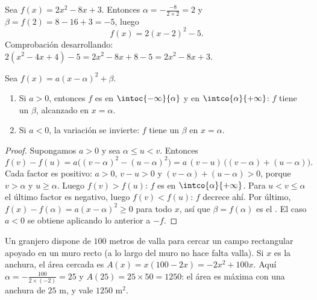 \begin{example}\label{ex:g11:quad:canonical}
Sea $f(x) = 2x^2 - 8x + 3$. Entonces $\alpha = -\frac{-8}{2 \times 2} = 2$
y $\beta = f(2) = 8 - 16 + 3 = -5$, luego
\[
f(x) = 2(x - 2)^2 - 5 .
\]
Comprobación desarrollando: $2(x^2 - 4x + 4) - 5 = 2x^2 - 8x + 8 - 5 =
2x^2 - 8x + 3$.
\end{example}

\begin{proposition}\label{prop:g11:quad:variations}
Sea $f(x) = a(x-\alpha)^2 + \beta$.
\begin{enumerate}
  \item Si $a > 0$, entonces $f$ es  en $\intoc{-\infty}{\alpha}$
        y  en $\intco{\alpha}{+\infty}$: $f$ tiene un
        \emph{} $\beta$, alcanzado en $x = \alpha$.
  \item Si $a < 0$, la variación se invierte: $f$ tiene un \emph{}
        $\beta$ en $x = \alpha$.
\end{enumerate}
\end{proposition}

\begin{proof}
Supongamos $a > 0$ y sea $\alpha \leq u < v$. Entonces
\[
f(v) - f(u) = a\bigl((v-\alpha)^2 - (u-\alpha)^2\bigr)
= a\,(v - u)\,\bigl((v-\alpha) + (u-\alpha)\bigr).
\]
Cada factor es positivo: $a > 0$, $v - u > 0$ y
$(v-\alpha) + (u-\alpha) > 0$, porque $v > \alpha$ y $u \geq \alpha$.
Luego $f(v) > f(u)$: $f$ es  en $\intco{\alpha}{+\infty}$. Para
$u < v \leq \alpha$ el último factor es negativo, luego $f(v) < f(u)$: $f$
decrece ahí. Por último, $f(x) - f(\alpha) = a(x-\alpha)^2 \geq 0$ para
todo $x$, así que $\beta = f(\alpha)$ es el . El caso $a < 0$ se
obtiene aplicando lo anterior a $-f$.
\end{proof}

\begin{example}
Un granjero dispone de $100$ metros de valla para cercar un campo
rectangular apoyado en un muro recto (a lo largo del muro no hace falta
valla). Si $x$ es la anchura, el área cercada es
$A(x) = x(100 - 2x) = -2x^2 + 100x$. Aquí $\alpha =
-\frac{100}{2\times(-2)} = 25$ y $A(25) = 25 \times 50 = 1250$: el área es
máxima con una anchura de $25$ m, y vale $1250$ m$^2$.
\end{example}


